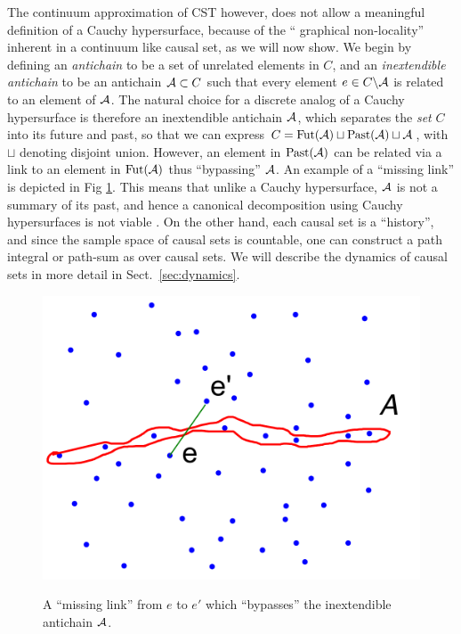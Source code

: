 The continuum approximation of CST however, does not allow a meaningful definition of a Cauchy hypersurface, because of 
the `` graphical non-locality'' inherent in a continuum like  causal set,
as we will now show.  We begin by defining an \emph{antichain} to be a set of unrelated elements in
  $C$, and an \emph{inextendible antichain} to be an antichain $\mathcal A \subset C$ such that every element $e \in C
  \backslash \mathcal A$ is related to an element of $\mathcal A$.  The   natural choice for a   discrete analog  of a
Cauchy  hypersurface is therefore an {inextendible antichain} $\mathcal A$, which separates the \emph{set} $C$ into its future and past, so that we can
express $C=\mathrm{Fut}(\mathcal A) \sqcup
\mathrm{Past}(\mathcal A) \sqcup \mathcal A$,  with  $\sqcup$ denoting disjoint union. However, an element  in $\mathrm{Past}(\mathcal A)$ can be related via
a link to an 
element in $\mathrm{Fut}(\mathcal A)$ thus ``bypassing'' $\mathcal A$. An example of a  ``missing link'' is  depicted in Fig
\ref{Missinglinks.fig}.   This means that unlike a Cauchy hypersurface, $\mathcal A$ is not a summary of its
past, and hence a canonical decomposition using Cauchy hypersurfaces is not viable \citep{antichain}.  On the other
hand, each causal
set is a  ``history'',  and since the sample space of causal sets is countable, one can construct a path integral or path-sum as
over causal sets. We will describe the dynamics of causal sets in more detail in Sect.~\ref{sec:dynamics}. 
\begin{figure}[!htb]
\centering \resizebox{3in}{!}  {\includegraphics[width=\textwidth]{NewMissinglinks}}
\caption{A ``missing link'' from $e$ to $e'$ which ``bypasses'' the inextendible antichain $\mathcal A$.}
\label{Missinglinks.fig}
\end{figure}


